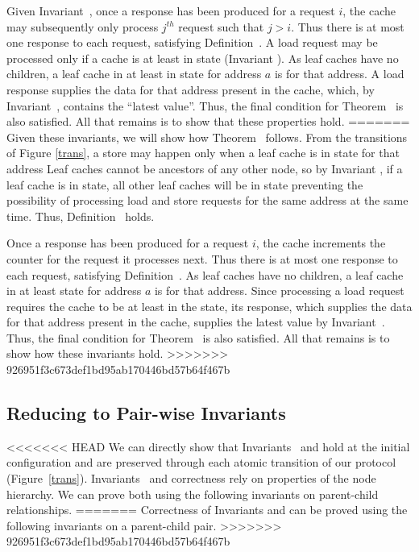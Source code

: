 Given Invariant~, once a response has been produced
for a request $i$, the cache may subsequently only process $j^{th}$
request such that $j > i$. Thus there is at most one response to each
request, satisfying Definition~. A load request
may be processed only if a cache is at least in \Sh{} state (Invariant
). As leaf caches have no children, a leaf cache in
at least in \Sh{} state for address $a$ is \clean for that address. A
load response supplies the data for that address present in the cache,
which, by Invariant~, contains the ``latest
value''. Thus, the final condition for Theorem~
is also satisfied. All that remains is to show that these properties hold.
=======
Given these invariants, we will show how Theorem~
follows. From the transitions of Figure \ref{trans}, a store may happen only
when a leaf cache is in \Mo{} state for that
address%
Leaf caches cannot be ancestors of any
other node, so by Invariant , if a leaf cache is
in \Mo{} state, all other leaf caches will be in \In{} state preventing the
possibility of processing load and store requests for the same address at the
same time. Thus, Definition~ holds.

Once a response has been produced for a request $i$, the cache increments the
counter for the request it processes next. Thus there is at most one response
to each request, satisfying Definition~. As leaf caches
have no children, a leaf cache in at least \Sh{} state for address $a$ is
\clean{} for that address. Since processing a load request requires the cache
to be at least in the \Sh{} state, its response, which supplies the data for
that address present in the cache, supplies the latest value by
Invariant~.  Thus, the final condition for
Theorem~ is also satisfied. All that remains is to show
how these invariants hold.
>>>>>>> 926951f3c673def1bd95ab170446bd57b64f467b

\subsection{Reducing to Pair-wise Invariants}
\label{pairwise}

<<<<<<< HEAD
We can directly show that Invariants~ and
 hold at the initial configuration and are
preserved through each atomic transition of our protocol
(Figure~\ref{trans}). Invariants~ and
 correctness rely on properties of the node
hierarchy. We can prove both using the following invariants on
parent-child relationships.
=======
Correctness of Invariants  and  can be
proved using the following invariants on a parent-child pair.
>>>>>>> 926951f3c673def1bd95ab170446bd57b64f467b

